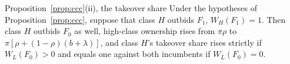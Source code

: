 
\begin{named}{Proposition~\ref{prop:ccc}(ii), the takeover share}
Under the hypotheses of Proposition~\ref{prop:ccc}, suppose that class \(H\) outbids \(F_1\), \(W_H(F_1)=1\). Then
class \(H\) outbids \(F_0\) as well, high-class ownership rises from \(\pi\rho\) to \(\pi[\rho+(1-\rho)(b+\lambda)]\),
and class \(H\)'s takeover share rises strictly if \(W_L(F_0)>0\) and equals one against both incumbents if
\(W_L(F_0)=0\).
\end{named}

